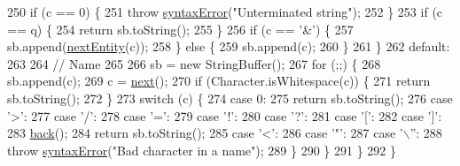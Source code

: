 \begin{DoxyCode}
250                 \textcolor{keywordflow}{if} (c == 0) \{
251                     \textcolor{keywordflow}{throw} \hyperlink{classorg_1_1json_1_1_j_s_o_n_tokener_a467f559950c039f28394ce3a0d2659ca}{syntaxError}(\textcolor{stringliteral}{"Unterminated string"});
252                 \}
253                 \textcolor{keywordflow}{if} (c == q) \{
254                     \textcolor{keywordflow}{return} sb.toString();
255                 \}
256                 \textcolor{keywordflow}{if} (c == \textcolor{charliteral}{'&'}) \{
257                     sb.append(\hyperlink{classorg_1_1json_1_1_x_m_l_tokener_aa67ac8eb561a438290fad648fd295fd5}{nextEntity}(c));
258                 \} \textcolor{keywordflow}{else} \{
259                     sb.append(c);
260                 \}
261             \}
262         \textcolor{keywordflow}{default}:
263 
264 \textcolor{comment}{// Name}
265 
266             sb = \textcolor{keyword}{new} StringBuffer();
267             \textcolor{keywordflow}{for} (;;) \{
268                 sb.append(c);
269                 c = \hyperlink{classorg_1_1json_1_1_j_s_o_n_tokener_ae129753dbe43ea50aa34e3c06773fdfb}{next}();
270                 \textcolor{keywordflow}{if} (Character.isWhitespace(c)) \{
271                     \textcolor{keywordflow}{return} sb.toString();
272                 \}
273                 \textcolor{keywordflow}{switch} (c) \{
274                 \textcolor{keywordflow}{case} 0:
275                     \textcolor{keywordflow}{return} sb.toString();
276                 \textcolor{keywordflow}{case} \textcolor{charliteral}{'>'}:
277                 \textcolor{keywordflow}{case} \textcolor{charliteral}{'/'}:
278                 \textcolor{keywordflow}{case} \textcolor{charliteral}{'='}:
279                 \textcolor{keywordflow}{case} \textcolor{charliteral}{'!'}:
280                 \textcolor{keywordflow}{case} \textcolor{charliteral}{'?'}:
281                 \textcolor{keywordflow}{case} \textcolor{charliteral}{'['}:
282                 \textcolor{keywordflow}{case} \textcolor{charliteral}{']'}:
283                     \hyperlink{classorg_1_1json_1_1_j_s_o_n_tokener_aa2eafdef7304777a457f3e66cc0e668b}{back}();
284                     \textcolor{keywordflow}{return} sb.toString();
285                 \textcolor{keywordflow}{case} \textcolor{charliteral}{'<'}:
286                 \textcolor{keywordflow}{case} \textcolor{charliteral}{'"'}:
287                 \textcolor{keywordflow}{case} \textcolor{charliteral}{'\(\backslash\)''}:
288                     \textcolor{keywordflow}{throw} \hyperlink{classorg_1_1json_1_1_j_s_o_n_tokener_a467f559950c039f28394ce3a0d2659ca}{syntaxError}(\textcolor{stringliteral}{"Bad character in a name"});
289                 \}
290             \}
291         \}
292     \}
\end{DoxyCode}
